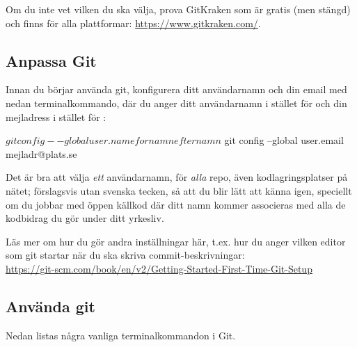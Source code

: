 Om du inte vet vilken du ska välja, prova GitKraken som är gratis (men stängd) och finns för alla plattformar: \url{https://www.gitkraken.com/}.


\subsection{Anpassa Git}

Innan du börjar använda git, konfigurera ditt användarnamn och din email med nedan terminalkommando, där du anger ditt användarnamn i stället för  och din mejladress i stället för :
\begin{REPLnonum}
$ git config --global user.name fornamnefternamn
$ git config --global user.email mejladr@plats.se
\end{REPLnonum}
Det är bra att välja \textit{ett} användarnamn, för \textit{alla} repo, även kodlagringsplatser på nätet; förslagsvis  utan svenska tecken,  så att du blir lätt att känna igen, speciellt om du jobbar med öppen källkod där ditt namn kommer associeras med alla de kodbidrag du gör under ditt yrkesliv.

Läs mer om hur du gör andra inställningar här, t.ex. hur du anger vilken editor som git startar när du ska skriva commit-beskrivningar: \\ \url{https://git-scm.com/book/en/v2/Getting-Started-First-Time-Git-Setup}
  
  
\subsection{Använda git}

Nedan listas några vanliga terminalkommandon i Git.


